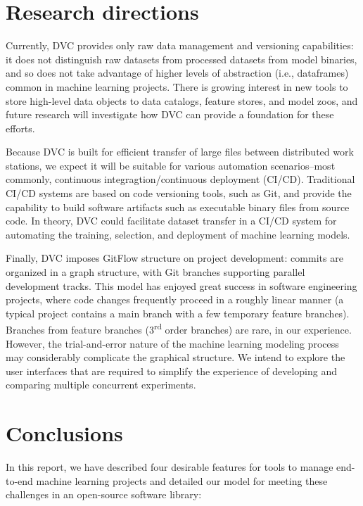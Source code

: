 \documentclass[10pt,sigconf, authordraft]{acmart}
\begin{document}
\section{Research directions}
Currently, DVC provides only raw data management and versioning capabilities: it does not distinguish raw datasets from processed datasets from model binaries, and so does not take advantage of higher levels of abstraction (i.e., dataframes) common in machine learning projects. There is growing interest in new tools to store high-level data objects to data catalogs, feature stores, and model zoos, and future research will investigate how DVC can provide a foundation for these efforts. 

Because DVC is built for efficient transfer of large files between distributed work stations, we expect it will be suitable for various automation scenarios--most commonly, continuous integragtion/continuous deployment (CI/CD). Traditional CI/CD systems are based on code versioning tools, such as Git, and provide the capability to build software artifacts such as executable binary files from source code. In theory, DVC could facilitate dataset transfer in a CI/CD system for automating the training, selection, and deployment of machine learning models. 

Finally, DVC imposes GitFlow structure on project development: commits are organized in a graph structure, with Git branches supporting parallel development tracks. This model has enjoyed great success in software engineering projects, where code changes frequently proceed in a roughly linear manner (a typical project contains a main branch with a few temporary feature branches). Branches from feature branches (3\textsuperscript{rd} order branches) are rare, in our experience. However, the trial-and-error nature of the machine learning modeling process may considerably complicate the graphical structure. We intend to explore the user interfaces that are required to simplify the experience of developing and comparing multiple concurrent experiments.

\section{Conclusions}
In this report, we have described four desirable features for tools to manage end-to-end machine learning projects and detailed our model for meeting these challenges in an open-source software library:
\end{document}
